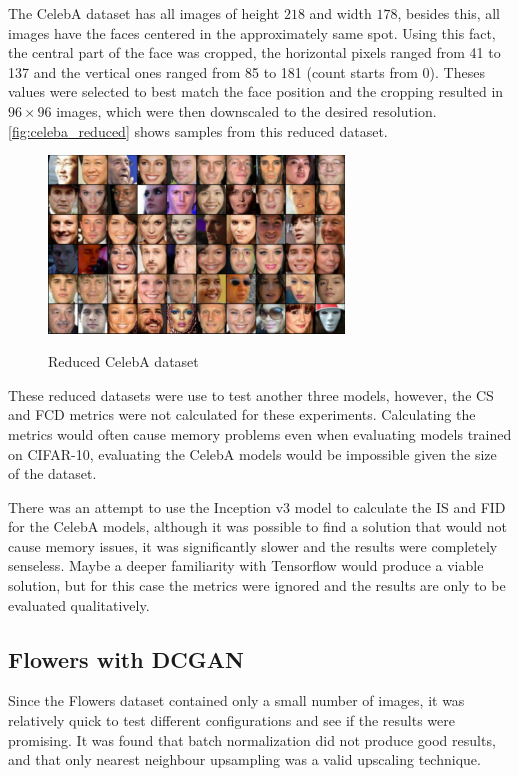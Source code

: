 The CelebA dataset has all images of height $218$ and width $178$, besides this, all images have the faces centered in the approximately same spot. Using this fact, the central part of the face was cropped, the horizontal pixels ranged from 41 to 137 and the vertical ones ranged from 85 to 181 (count starts from 0). Theses values were selected to best match the face position and the cropping resulted in $96\times96$ images, which were then downscaled to the desired resolution. \autoref{fig:celeba_reduced} shows samples from this reduced dataset.
\begin{figure}[hbt]
    \centering
    \caption{Reduced CelebA dataset}
    \includegraphics[width=0.7\textwidth]{chapters/Experiments/Other/CelebA_reduced.pdf}
    \label{fig:celeba_reduced}
\end{figure}

These reduced datasets were use to test another three models, however, the \gls{CS} and \gls{FCD} metrics were not calculated for these experiments. Calculating the metrics would often cause memory problems even when evaluating models trained on \gls{CIFAR}-10, evaluating the CelebA models would be impossible given the size of the dataset. 

There was an attempt to use the Inception v3 model to calculate the \gls{IS} and \gls{FID} for the CelebA models, although it was possible to find a solution that would not cause memory issues, it was significantly slower and the results were completely senseless. Maybe a deeper familiarity with Tensorflow would produce a viable solution, but for this case the metrics were ignored and the results are only to be evaluated qualitatively.

\subsection{Flowers with DCGAN}
Since the Flowers dataset contained only a small number of images, it was relatively quick to test different configurations and see if the results were promising. It was found that batch normalization did not produce good results, and that only nearest neighbour upsampling was a valid upscaling technique.

